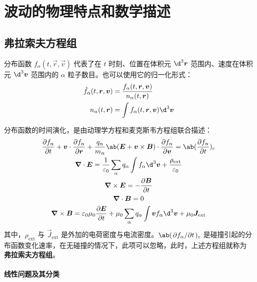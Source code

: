 
\chapter{波动的物理特点和数学描述}

\section{弗拉索夫方程组}

分布函数 $f_\alpha(t, \vec{r}, \vec{v})$ 代表了在 $t$ 时刻、位置在体积元 $\d^3\vec{r}$ 范围内、速度在体积元 $\d^3\vec{v}$ 范围内的 $\alpha$ 粒子数目。也可以使用它的归一化形式：
\begin{subequations}\begin{align}
\hat{f}_\alpha(t, \vec{r}, \vec{v}) &
= \frac{f_\alpha(t, \vec{r}, \vec{v})}
{n_\alpha(t, \vec{r})} \\
n_\alpha(t, \vec{r}) &= \int f_\alpha(t, \vec{r}, \vec{v}) \d^3\vec{v}
\end{align}\end{subequations}

分布函数的时间演化，是由动理学方程和麦克斯韦方程组联合描述：
\begin{subequations}\begin{gather}
\pdv{f_\alpha}{t}
+ \vec{v} \cdot \pdv{f_\alpha}{\vec{r}}
+ \frac{q_\alpha}{m_\alpha} \ab(
    \vec{E} + \vec{v} \times \vec{B}
) \cdot \pdv{f_\alpha}{\vec{v}}
= \ab(\pdv{f_\alpha}{t})_c \\
\dive{\vec{E}} = \frac{1}{\varepsilon_0}
\sum_\alpha q_\alpha \int f_\alpha \d^3 \vec{v}
+ \frac{\rho_{\text{ext}}}{\varepsilon_0} \\
\curl{\vec{E}} = - \pdv{\vec{B}}{t} \\
\dive{\vec{B}} = 0 \\
\curl{\vec{B}} = \varepsilon_0 \mu_0 \pdv{\vec{E}}{t}
+ \mu_0 \sum_\alpha q_\alpha \int \vec{v} f_\alpha \d^3 \vec{v}
+ \mu_0 \vec{J}_{\text{ext}}
\end{gather}\end{subequations}
其中，$\rho_{\text{ext}}$ 与 $\vec{J}_{\text{ext}}$ 是外加的电荷密度与电流密度。$\ab(\pdv{f_\alpha}/{t})_c$ 是碰撞引起的分布函数变化速率，在无碰撞的情况下，此项可以忽略，此时，上述方程组就称为 \textbf{弗拉索夫方程组}。

\subsubsection{线性问题及其分类}

